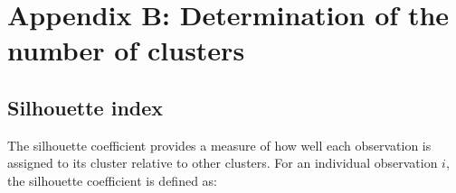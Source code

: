 \documentclass[a4paper,11pt,oneside]{article}
\begin{document}

\section{Appendix B: Determination of the number of clusters}
\label{sec:appendix_B}

\subsection{Silhouette index}




The silhouette coefficient provides a measure of how well each observation is assigned to its cluster relative to other clusters. For an individual observation \(i\), the silhouette coefficient is defined as:
\end{document}

